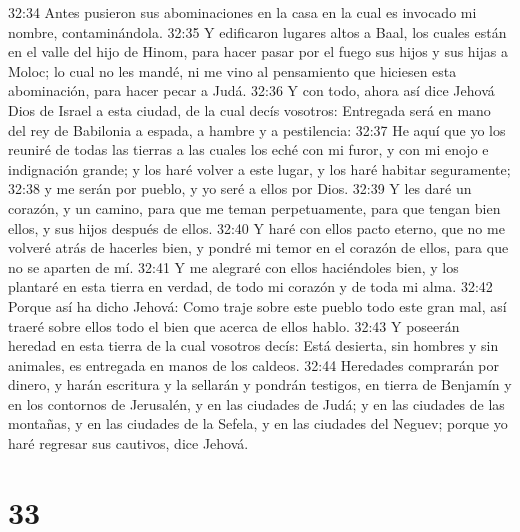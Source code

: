 32:34 Antes pusieron sus abominaciones en la casa en la cual es invocado mi nombre, contaminándola. 
32:35 Y edificaron lugares altos a Baal, los cuales están en el valle del hijo de Hinom,   para hacer pasar por el fuego sus hijos y sus hijas a Moloc; lo cual no les mandé, ni me vino al pensamiento que hiciesen esta abominación, para hacer pecar a Judá.  
32:36 Y con todo, ahora así dice Jehová Dios de Israel a esta ciudad, de la cual decís vosotros: Entregada será en mano del rey de Babilonia a espada, a hambre y a pestilencia:  
32:37 He aquí que yo los reuniré de todas las tierras a las cuales los eché con mi furor, y con mi enojo e indignación grande; y los haré volver a este lugar, y los haré habitar seguramente;  
32:38 y me serán por pueblo, y yo seré a ellos por Dios.  
32:39 Y les daré un corazón, y un camino, para que me teman perpetuamente, para que tengan bien ellos, y sus hijos después de ellos.  
32:40 Y haré con ellos pacto eterno, que no me volveré atrás de hacerles bien, y pondré mi temor en el corazón de ellos, para que no se aparten de mí.  
32:41 Y me alegraré con ellos haciéndoles bien, y los plantaré en esta tierra en verdad, de todo mi corazón y de toda mi alma.  
32:42 Porque así ha dicho Jehová: Como traje sobre este pueblo todo este gran mal, así traeré sobre ellos todo el bien que acerca de ellos hablo.  
32:43 Y poseerán heredad en esta tierra de la cual vosotros decís: Está desierta, sin hombres y sin animales, es entregada en manos de los caldeos.  
32:44 Heredades comprarán por dinero, y harán escritura y la sellarán y pondrán testigos, en tierra de Benjamín y en los contornos de Jerusalén, y en las ciudades de Judá; y en las ciudades de las montañas, y en las ciudades de la Sefela, y en las ciudades del Neguev; porque yo haré regresar sus cautivos, dice Jehová.  

\chapter{33}

